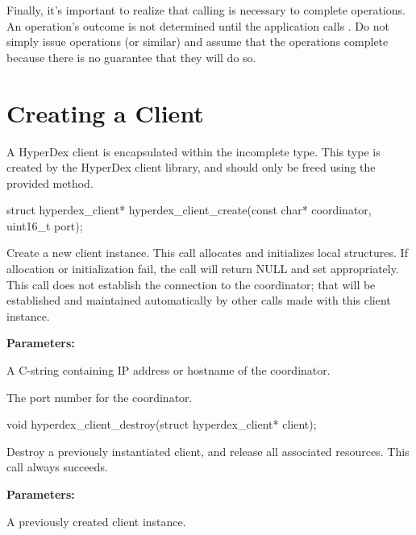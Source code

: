 Finally, it's important to realize that calling  is
necessary to complete operations.  An operation's outcome is not determined
until the application calls .  Do not simply issue
 operations (or similar) and assume that the
operations complete because there is no guarantee that they will do so.

\section{Creating a Client}
\label{sec:api:c:client:create}

A HyperDex client is encapsulated within the incomplete  type.  This type is created by the HyperDex client library,
and should only be freed using the provided method.

\begin{ccode}
struct hyperdex_client*
hyperdex_client_create(const char* coordinator, uint16_t port);
\end{ccode}
Create a new client instance.  This call allocates and initializes
local structures.  If allocation or initialization fail, the call will return
NULL and set  appropriately.  This call does not establish the
connection to the coordinator; that will be established and maintained
automatically by other calls made with this client instance.

\textbf{Parameters:}
\begin{description}[labelindent=\widthof{{\code{coordinator}}},leftmargin=*,noitemsep,nolistsep,align=right]
\item[\code{coordinator}] A C-string containing IP address or hostname of the
    coordinator.
\item[\code{port}] The port number for the coordinator.
\end{description}

\begin{ccode}
void
hyperdex_client_destroy(struct hyperdex_client* client);
\end{ccode}
Destroy a previously instantiated client, and release all associated
resources.  This call always succeeds.

\textbf{Parameters:}
\begin{description}[labelindent=\widthof{{\code{client}}},leftmargin=*,noitemsep,nolistsep,align=right]
\item[\code{client}] A previously created client instance.
\end{description}

